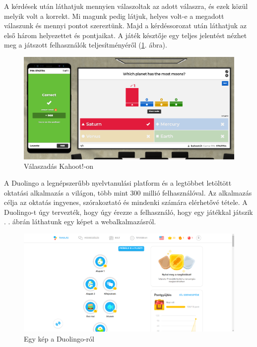 A kérdések után láthatjuk mennyien válaszoltak az adott válaszra, és ezek közül melyik volt a korrekt. Mi magunk pedig látjuk, helyes volt-e a megadott válaszunk és mennyi pontot szereztünk. Majd a kérdéssorozat után láthatjuk az első három helyezettet és pontjaikat. A játék késztője egy teljes jelentést nézhet meg a játszott felhasználók teljesítményéről (\ref{fig:kahoot_3}. ábra).

\begin{figure}[h]
	\centering
	\includegraphics[width=\textwidth]{images/kahoot_play2.png}
	\caption{Válaszadás Kahoot!-on}
	\label{fig:kahoot_3}
\end{figure}


A Duolingo a legnépszerűbb nyelvtanulási platform és a legtöbbet letöltött oktatási alkalmazás a világon, több mint 300 millió felhasználóval. Az alkalmazás célja az oktatás ingyenes, szórakoztató és mindenki számára elérhetővé tétele. A Duolingo-t úgy tervezték, hogy úgy érezze a felhasználó, hogy egy játékkal játszik \cite{whatIsDuolingo}.
. ábrán láthatunk egy képet a webalkalmazásról.

\begin{figure}[h]
  \centering
  \includegraphics[width=\textwidth]{images/Duolingo_main_page.png}
  \caption{Egy kép a Duolingo-ról}
  \label{fig:duolingo}
\end{figure}

